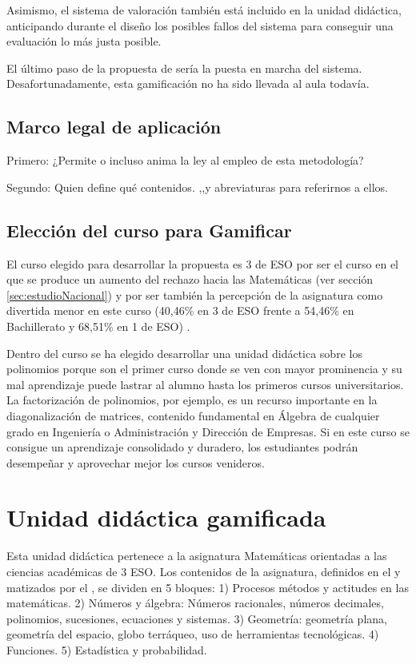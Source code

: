 Asimismo, el sistema de valoración también está incluido en la unidad didáctica, anticipando durante el diseño los posibles fallos del sistema para conseguir una evaluación lo más justa posible.

El último paso de la propuesta de \cite{kapp2013gamification} sería la puesta en marcha del sistema. 
%
Desafortunadamente, esta gamificación no ha sido llevada al aula todavía.

\subsection{Marco legal de aplicación}


Primero: ¿Permite o incluso anima la ley al empleo de esta metodología?

Segundo: Quien define qué contenidos. \lomce,\boe,\bocm y abreviaturas para referirnos a ellos.

\subsection{Elección del curso para Gamificar}

El curso elegido para desarrollar la propuesta es 3 de ESO por ser el curso en el que se produce un aumento del rechazo hacia las Matemáticas (ver sección \ref{sec:estudioNacional}) 
%
y por ser también la percepción de la asignatura como divertida menor en este curso (40,46\% en 3 de ESO frente a 54,46\% en Bachillerato y 68,51\% en 1 de ESO) \cite{ActitudesHaciaMates}.

Dentro del curso se ha elegido desarrollar una unidad didáctica sobre los polinomios porque son el primer curso donde se ven con mayor prominencia y su mal aprendizaje puede lastrar al alumno hasta los primeros cursos universitarios.
%
La factorización de polinomios, por ejemplo, es un recurso importante en la diagonalización de matrices, contenido fundamental en Álgebra de cualquier grado en Ingeniería o Administración y Dirección de Empresas.
%
Si en este curso se consigue un aprendizaje consolidado y duradero, los estudiantes podrán desempeñar y aprovechar mejor los cursos venideros.


\section{Unidad didáctica gamificada}

\label{sec:UD}
%
Esta unidad didáctica pertenece a la asignatura Matemáticas orientadas a las ciencias académicas de 3 ESO. 
%
Los contenidos de la asignatura, definidos en el \boe y matizados por el \bocm, se dividen en 5 bloques:
1) Procesos métodos y actitudes en las matemáticas. 
2) Números y álgebra: Números racionales, números decimales, polinomios, sucesiones, ecuaciones y sistemas.
3) Geometría: geometría plana, geometría del espacio, globo terráqueo, uso de herramientas tecnológicas.
4) Funciones.
5) Estadística y probabilidad.

